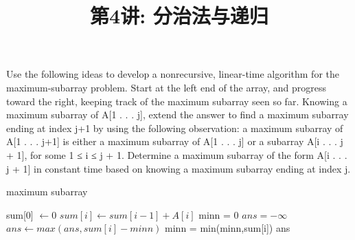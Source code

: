 \documentclass[a4paper, justified]{tufte-handout}
\title{第4讲: 分治法与递归}
\date{\zhtoday} %
\begin{document}
\maketitle
\noplagiarism %
\begin{abstract}
\end{abstract}
\beginrequired

\begin{problem}[TC 4.1-5]
Use the following ideas to develop a nonrecursive, linear-time algorithm for the maximum-subarray problem. Start at the left end of the array, and progress toward the right, keeping track of the maximum subarray seen so far. Knowing a maximum subarray of A[1 . . . j], extend the answer to find a maximum subarray ending at index j+1 by using the following observation: a maximum subarray of A[1 . . . j+1] is either a maximum subarray of A[1 . . . j] or a subarray A[i . . . j + 1], for some 1 ≤ i ≤ j + 1. Determine a maximum subarray of the form A[i . . . j + 1] in constant time based on knowing a maximum subarray ending at index j.
\end{problem}

\begin{solution}
  \begin{algorithm}[H]
    \caption{maximum subarray}
    \label{alg:sum}
    \begin{algorithmic}[1]
       
      \State sum[0] $\gets 0$
      \State $sum[i] \gets sum[i-1] + A[i]$
      \EndFor
      \State minn = 0
      \State $ans = - \infty$
      \State $ans \gets max(ans,sum[i]-minn)$
      \State minn = min(minn,sum[i])
      \EndFor
      \Return ans
      \EndProcedure
    \end{algorithmic}
  \end{algorithm}

\end{solution}

\begin{problem}[TC 4.3-3]
\end{problem}
\end{document}
